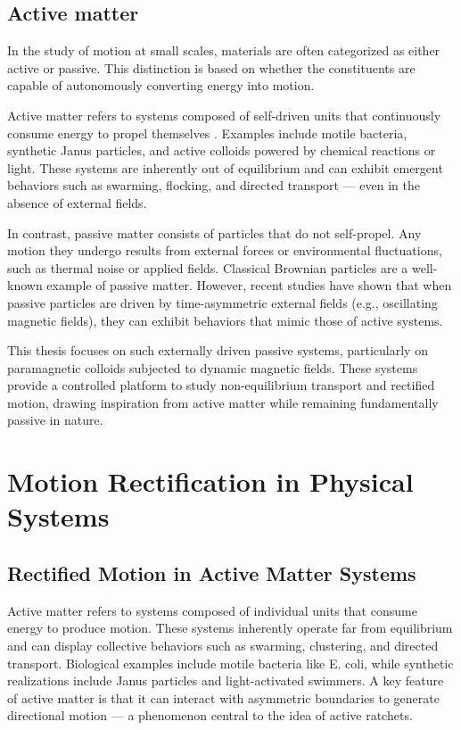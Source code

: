 \section{Active matter}

In the study of motion at small scales, materials are often categorized as either active or passive. This distinction is based on whether the constituents are capable of autonomously converting energy into motion.

Active matter refers to systems composed of self-driven units that continuously consume energy to propel themselves \cite{marchetti2013hydrodynamics, bechinger2016active}. Examples include motile bacteria, synthetic Janus particles, and active colloids powered by chemical reactions or light. These systems are inherently out of equilibrium and can exhibit emergent behaviors such as swarming, flocking, and directed transport — even in the absence of external fields.

In contrast, passive matter consists of particles that do not self-propel. Any motion they undergo results from external forces or environmental fluctuations, such as thermal noise or applied fields. Classical Brownian particles are a well-known example of passive matter. However, recent studies have shown that when passive particles are driven by time-asymmetric external fields (e.g., oscillating magnetic fields), they can exhibit behaviors that mimic those of active systems.

This thesis focuses on such externally driven passive systems, particularly on paramagnetic colloids subjected to dynamic magnetic fields. These systems provide a controlled platform to study non-equilibrium transport and rectified motion, drawing inspiration from active matter while remaining fundamentally passive in nature.

\chapter{Motion Rectification in Physical Systems}
\label{ch:motionrectificationinphysicalsystems}

\section{Rectified Motion in Active Matter Systems}

Active matter refers to systems composed of individual units that consume energy to produce motion. These systems inherently operate far from equilibrium and can display collective behaviors such as swarming, clustering, and directed transport. Biological examples include motile bacteria like E. coli, while synthetic realizations include Janus particles and light-activated swimmers. A key feature of active matter is that it can interact with asymmetric boundaries to generate directional motion — a phenomenon central to the idea of active ratchets.

